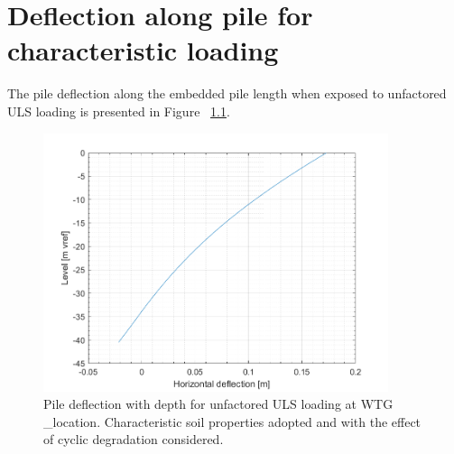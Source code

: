 \chapter{Deflection along pile for characteristic loading}\label{sec_5}

The pile deflection along the embedded pile length when exposed to unfactored ULS loading is presented in Figure ~\ref{Lat_disp}.



\begin{figure}[!htbp]
\includegraphics[width=0.9\textwidth]{AppendixGenerationFiles/ProjectLocation/deflection_plot.png}
\caption{Pile deflection with depth for unfactored ULS loading at WTG {\ID_location}. Characteristic soil properties adopted and with the effect of cyclic degradation considered.}
\label{Lat_disp}\end{figure}
